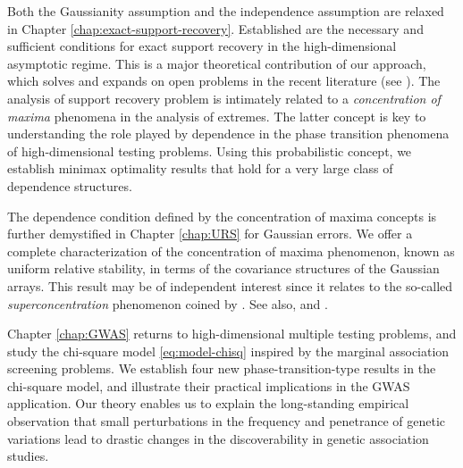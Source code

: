 Both the Gaussianity assumption and the independence assumption are relaxed in Chapter \ref{chap:exact-support-recovery}.
Established are the necessary and sufficient conditions for exact support recovery in the high-dimensional asymptotic regime.
This is a major theoretical contribution of our approach, which solves and expands on open problems in the recent literature 
(see \cite{butucea2018variable, gao2018fundamental}).
The analysis of support recovery problem is intimately related to a \emph{concentration of maxima} phenomena in the analysis of extremes.
The latter concept is key to understanding the role played by dependence in the phase transition phenomena of high-dimensional testing problems.
Using this probabilistic concept, we establish minimax optimality results that hold for a very large class of dependence structures.

The dependence condition defined by the concentration of maxima  concepts is further demystified in Chapter \ref{chap:URS} for Gaussian errors.
We offer a complete characterization of the concentration of maxima phenomenon, known as uniform relative stability, in terms of the covariance structures of the Gaussian arrays.
This result may be of independent interest since it relates to the so-called \emph{superconcentration} phenomenon coined by \cite{chatterjee2014superconcentration}.
See also, \cite{gao2018fundamental} and \citet*{kartsioukas2019rate}.

Chapter \ref{chap:GWAS} returns to high-dimensional multiple testing problems, and study the chi-square model \eqref{eq:model-chisq} inspired by the marginal association screening problems.
We establish four new phase-transition-type results in the chi-square model, and illustrate their practical implications in the GWAS application.
Our theory enables us to explain the long-standing empirical observation that small perturbations in the frequency and penetrance of genetic variations lead to drastic changes in the discoverability in genetic association studies.



